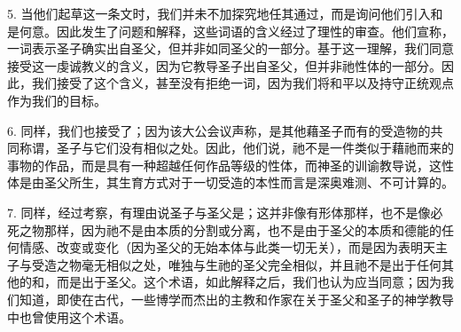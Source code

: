 \par

\par

\par

\par

\par

5. 当他们起草这一条文时，我们并未不加探究地任其通过，而是询问他们引入和是何意。因此发生了问题和解释，这些词语的含义经过了理性的审查。他们宣称，一词表示圣子确实出自圣父，但并非如同圣父的一部分。基于这一理解，我们同意接受这一虔诚教义的含义，因为它教导圣子出自圣父，但并非祂性体的一部分。因此，我们接受了这个含义，甚至没有拒绝一词，因为我们将和平以及持守正统观点作为我们的目标。\par

6. 同样，我们也接受了；因为该大公会议声称，是其他藉圣子而有的受造物的共同称谓，圣子与它们没有相似之处。因此，他们说，祂不是一件类似于藉祂而来的事物的作品，而是具有一种超越任何作品等级的性体，而神圣的训谕教导说，这性体是由圣父所生，其生育方式对于一切受造的本性而言是深奥难测、不可计算的。\par

7. 同样，经过考察，有理由说圣子与圣父是；这并非像有形体那样，也不是像必死之物那样，因为祂不是由本质的分割或分离，也不是由于圣父的本质和德能的任何情感、改变或变化（因为圣父的无始本体与此类一切无关），而是因为表明天主子与受造之物毫无相似之处，唯独与生祂的圣父完全相似，并且祂不是出于任何其他的和，而是出于圣父。这个术语，如此解释之后，我们也认为应当同意；因为我们知道，即使在古代，一些博学而杰出的主教和作家在关于圣父和圣子的神学教导中也曾使用这个术语。\par

